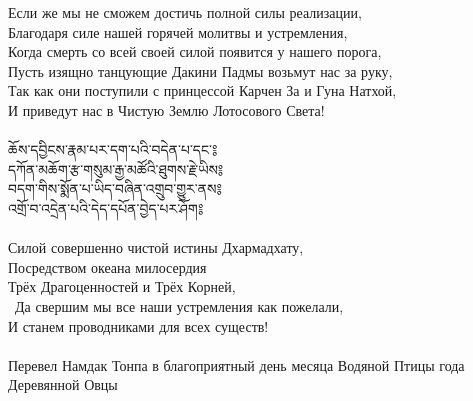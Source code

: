 Если же мы не сможем достичь полной силы реализации,\\
Благодаря силе нашей горячей молитвы и устремления,\\
Когда смерть со всей своей силой появится у нашего порога,\\
Пусть изящно танцующие Дакини Падмы возьмут нас за руку,\\
Так как они поступили с принцессой Карчен За и Гуна Натхой,\\
И приведут нас в Чистую Землю Лотосового Света!\\
\\
{\ti ཆོས་དབྱིངས་རྣམ་པར་དག་པའི་བདེན་པ་དང་༔\\
དཀོན་མཆོག་རྩ་གསུམ་རྒྱ་མཚོའི་ཐུགས་རྗེ་ཡིས༔\\
བདག་གིས་སྨོན་པ་ཡིད་བཞིན་འགྲུབ་གྱུར་ནས༔\\
འགྲོ་བ་འདྲེན་པའི་དེད་དཔོན་བྱེད་པར་ཤོག༔}\\
\\
Силой совершенно чистой истины Дхармадхату,\\
Посредством океана милосердия \\ \indent Трёх Драгоценностей и Трёх Корней,\\\
Да свершим мы все наши устремления как пожелали,\\
И станем проводниками для всех существ!\\
\\
\scriptsize Перевел Намдак Тонпа в благоприятный день месяца Водяной Птицы года Деревянной Овцы\normalsize

